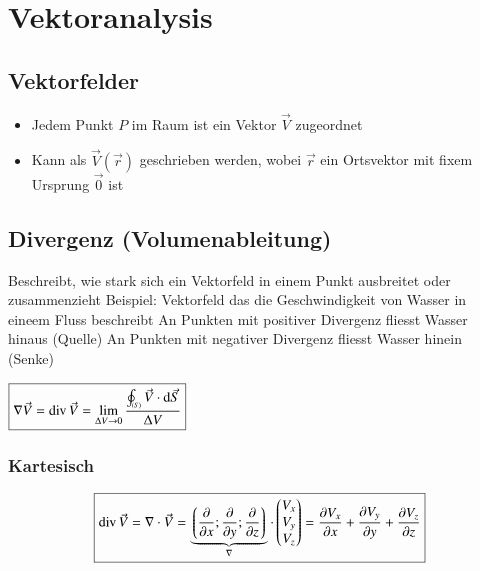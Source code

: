\section{Vektoranalysis}

\subsection{Vektorfelder}
\begin{itemize}
    \item Jedem Punkt $P$ im Raum ist ein Vektor $\vec{V}$ zugeordnet
    \item Kann als $\vec{V}(\vec{r})$ geschrieben werden, wobei $\vec{r}$ ein Ortsvektor mit fixem Ursprung $\vec{0}$ ist
\end{itemize}


\subsection{Divergenz (Volumenableitung)}
\begin{outline}
    \1 Beschreibt, wie stark sich ein Vektorfeld in einem Punkt ausbreitet oder zusammenzieht
    \1 Beispiel: Vektorfeld das die Geschwindigkeit von Wasser in eineem Fluss beschreibt
        \2 An Punkten mit positiver Divergenz fliesst Wasser hinaus (Quelle)
        \2 An Punkten mit negativer Divergenz fliesst Wasser hinein (Senke)
\end{outline}

$\boxed{\nabla\vec{V} = \operatorname{div} \vec{V} = \lim_{\Delta V\to 0}\frac{\oint_{\scriptscriptstyle (S)}\vec{V}\cdot\mathop{} \! \mathrm{d}\vec{S}}{\Delta V}}$


\subsubsection{Kartesisch}
\[
    \boxed{%
        \div \vec{V}
        = \nabla\cdot\vec{V}
        = \underbrace{%
            \left\lgroup%
                \frac{\partial}{\partial x};\frac{\partial}{\partial y};\frac{\partial}{\partial z}%
            \right\rgroup}_{\nabla} \cdot 
        \begin{pmatrix}
            V_x \\ V_y \\ V_z
        \end{pmatrix}
        = \frac{\partial V_x}{\partial x} + \frac{\partial V_y}{\partial y} + \frac{\partial V_z}{\partial z}
    }
\]


